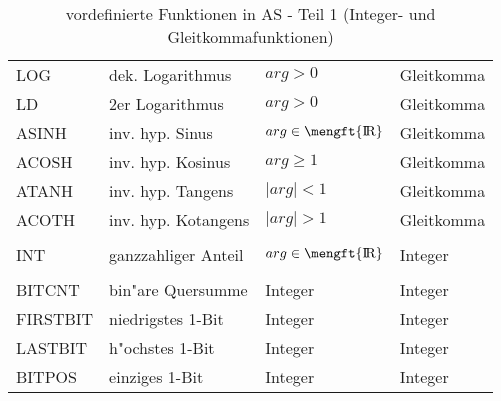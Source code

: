 \documentclass[12pt,a4paper,twoside]{report}
\def \rz{\hbox{\mengft{I \hskip -1.7mm R}}}
\begin{document}
\begin{table*}[htbp]
\begin{center}
\begin{tabular}{|l|l|l|l|}
LOG      & dek. Logarithmus     & $arg > 0$ & Gleitkomma \\
LD       & 2er Logarithmus      & $arg > 0$ & Gleitkomma \\
ASINH    & inv. hyp. Sinus      & $arg \in \rz$ & Gleitkomma \\
ACOSH    & inv. hyp. Kosinus    & $arg \geq 1$ & Gleitkomma \\
ATANH    & inv. hyp. Tangens    & $\mid arg \mid < 1$ & Gleitkomma \\
ACOTH    & inv. hyp. Kotangens  & $\mid arg \mid > 1$ & Gleitkomma \\
         &                      & & \\
INT      & ganzzahliger Anteil  & $arg \in \rz$ & Integer \\
         &                      & & \\
BITCNT   & bin"are Quersumme    & Integer      & Integer \\
FIRSTBIT & niedrigstes 1-Bit    & Integer      & Integer \\
LASTBIT  & h"ochstes 1-Bit      & Integer      & Integer \\
BITPOS   & einziges 1-Bit       & Integer      & Integer \\
\hline
\end{tabular}\end{center}
\caption{vordefinierte Funktionen in AS - Teil 1 (Integer- und
         Gleitkommafunktionen)\label{TabFuncs1}}
\end{table*}
\end{document}
